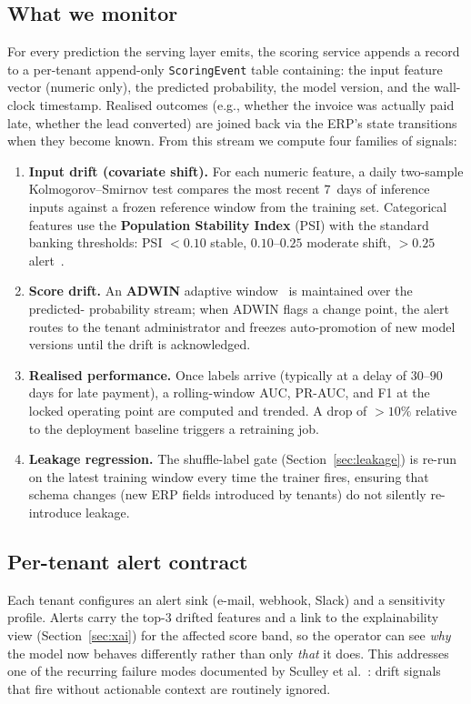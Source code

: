 \documentclass[conference]{IEEEtran}
\begin{document}
\subsection{What we monitor}
For every prediction the serving layer emits, the scoring service appends a
record to a per-tenant append-only \texttt{ScoringEvent} table containing:
the input feature vector (numeric only), the predicted probability, the
model version, and the wall-clock timestamp. Realised outcomes (e.g.,
whether the invoice was actually paid late, whether the lead converted) are
joined back via the ERP's state transitions when they become known. From
this stream we compute four families of signals:

\begin{enumerate}
    \item \textbf{Input drift (covariate shift).} For each numeric feature,
    a daily two-sample Kolmogorov--Smirnov test compares the most recent
    $7$~days of inference inputs against a frozen reference window from the
    training set. Categorical features use the
    \textbf{Population Stability Index} (PSI) with the standard banking
    thresholds: PSI $<\!0.10$ stable, $0.10$--$0.25$ moderate shift,
    $>\!0.25$ alert~\cite{wu2019psi,lessmann2015benchmarking}.
    \item \textbf{Score drift.} An \textbf{ADWIN} adaptive
    window~\cite{bifet2007adwin} is maintained over the predicted-
    probability stream; when ADWIN flags a change point, the alert routes
    to the tenant administrator and freezes auto-promotion of new model
    versions until the drift is acknowledged.
    \item \textbf{Realised performance.} Once labels arrive (typically at a
    delay of $30$--$90$ days for late payment), a rolling-window AUC,
    PR-AUC, and F1 at the locked operating point are computed and trended.
    A drop of $>\!10\%$ relative to the deployment baseline triggers a
    retraining job.
    \item \textbf{Leakage regression.} The shuffle-label gate
    (Section~\ref{sec:leakage}) is re-run on the latest training window
    every time the trainer fires, ensuring that schema changes (new ERP
    fields introduced by tenants) do not silently re-introduce leakage.
\end{enumerate}

\subsection{Per-tenant alert contract}
Each tenant configures an alert sink (e-mail, webhook, Slack) and a
sensitivity profile. Alerts carry the top-$3$ drifted features and a link
to the explainability view (Section~\ref{sec:xai}) for the affected score
band, so the operator can see \emph{why} the model now behaves differently
rather than only \emph{that} it does. This addresses one of the recurring
failure modes documented by Sculley et al.~\cite{sculley2015hidden}: drift
signals that fire without actionable context are routinely ignored.
\end{document}
